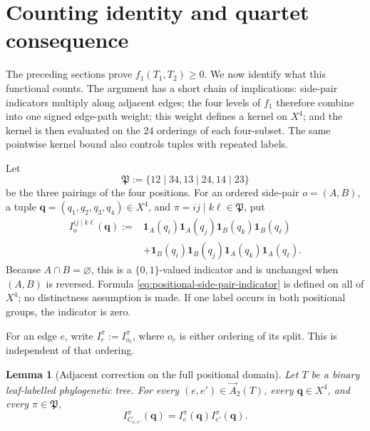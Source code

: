 \documentclass[11pt]{article}
\newtheorem{lemma}[theorem]{Lemma}
\newcommand{\ind}{\mathbf 1}
\begin{document}
\section{Counting identity and quartet consequence}\label{sec:counting}

The preceding sections prove $f_1(T_1,T_2)\ge0$.  We now identify what this
functional counts.  The argument has a short chain of implications:
side-pair indicators multiply along adjacent edges; the four levels of $f_1$
therefore combine into one signed edge-path weight; this weight defines a
kernel on $X^4$; and the kernel is then evaluated on the $24$ orderings of
each four-subset.  The same pointwise kernel bound also controls tuples with
repeated labels.

Let
\[
 \mathfrak P:=\{12\mid34,13\mid24,14\mid23\}
\]
be the three pairings of the four positions.  For an ordered side-pair
$o=(A,B)$, a tuple
$\boldsymbol q=(q_1,q_2,q_3,q_4)\in X^4$, and
$\pi=ij\mid k\ell\in\mathfrak P$, put
\begin{equation}\label{eq:positional-side-pair-indicator}
\begin{aligned}
 I_o^{ij\mid k\ell}(\boldsymbol q)
 :={}&\ind_A(q_i)\ind_A(q_j)\ind_B(q_k)\ind_B(q_\ell)\\
 &+\ind_B(q_i)\ind_B(q_j)\ind_A(q_k)\ind_A(q_\ell).
\end{aligned}
\end{equation}
Because $A\cap B=\varnothing$, this is a $\{0,1\}$-valued indicator and is
unchanged when $(A,B)$ is reversed.  Formula
\eqref{eq:positional-side-pair-indicator} is defined on all of $X^4$; no
distinctness assumption is made.  If one label occurs in both positional
groups, the indicator is zero.

For an edge $e$, write $I_e^\pi:=I_{o_e}^\pi$, where $o_e$ is either ordering
of its split.  This is independent of that ordering.

\begin{lemma}[Adjacent correction on the full positional domain]
\label{lem:full-domain-correction-indicator}
Let $T$ be a binary leaf-labelled phylogenetic tree.  For every
$(e,e')\in\overrightarrow A_2(T)$, every $\boldsymbol q\in X^4$, and every
$\pi\in\mathfrak P$,
\begin{equation}\label{eq:full-domain-correction-indicator}
 I_{C_{e,e'}}^\pi(\boldsymbol q)
 =I_e^\pi(\boldsymbol q)I_{e'}^\pi(\boldsymbol q).
\end{equation}
\end{lemma}
\end{document}
